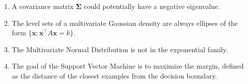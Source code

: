 \documentclass[letter, 12pt]{article}
\begin{document}
\begin{enumerate}
\begin{enumerate}
{      in the context of linear regression.
      }
    \vspace{.3in}
    \item
       \parbox[t]{5in}{
      A covariance matrix $\mathbf{\Sigma}$ could potentially have a negative eigenvalue.
      }
    \vspace{.3in}
    \item
       \parbox[t]{5in}{
      The level sets of a multivariate Gaussian density are always ellipses of the form
      $\{\mathbf{x}: \mathbf{x}^\top A \mathbf{x} = k\}$.
      }
    \vspace{.3in}
    \item
       \parbox[t]{5in}{
          The Multivariate Normal Distribution is not in the exponential family.
      }
    \vspace{.3in}
    \item
       \parbox[t]{5in}{
          The goal of the Support Vector Machine is to maximize the margin, defined as the distance
          of the closest examples from the decision boundary.
      }


\end{enumerate}
\end{enumerate}
\end{document}
